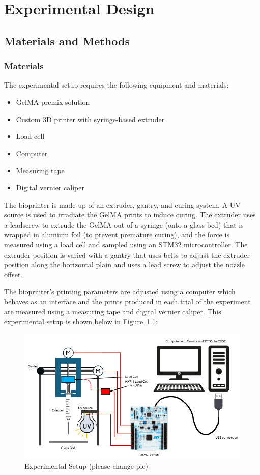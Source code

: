 \chapter{Experimental Design}

\section{Materials and Methods}
\subsection{Materials}
The experimental setup requires the following equipment and materials:
\begin{itemize}
\item GelMA premix solution
\item Custom 3D printer with syringe-based extruder
\item Load cell
\item Computer
\item Measuring tape
\item Digital vernier caliper
\end{itemize}

The bioprinter is made up of an extruder, gantry, and curing system. A UV source is used to irradiate the GelMA prints to induce curing. The extruder uses a leadscrew to extrude the GelMA out of a syringe (onto a glass bed) that is wrapped in alumium foil (to prevent premature curing), and the force is measured using a load cell and sampled using an STM32 microcontroller. The extruder position is varied with a gantry that uses belts to adjust the extruder position along the horizontal plain and uses a lead screw to adjust the nozzle offset.

The bioprinter’s printing parameters are adjusted using a computer which behaves as an interface and the prints produced in each trial of the experiment are measured using a measuring tape and digital vernier caliper. This experimental setup is shown below in Figure~\ref{fig:experimentalSetup}:
 \begin{figure}[h]
    \centering
    \includegraphics[scale=0.7]{figs/ExperimentalSetup.png}
    \caption{Experimental Setup (please change pic)}
    \label{fig:experimentalSetup}
\end{figure}

